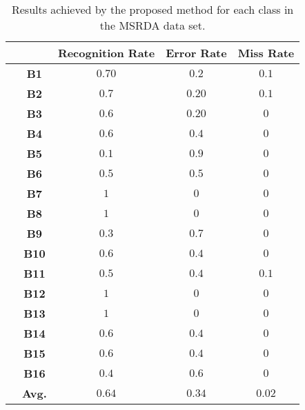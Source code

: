 \documentclass[runningheads,a4paper]{llncs}
\begin{document}
\begin{table}
\begin{scriptsize}
\setlength\tabcolsep{0.2cm}
	\renewcommand{\arraystretch}{1.3}
	\centering
	\begin{tabular}{|c|c|c|c|c|}
			\hline
		\multicolumn{2}{|c|}{~} & \bfseries Recognition Rate & \bfseries Error Rate & \bfseries Miss  Rate \\ \hline
    			
			\multirow{17}{*}{\rotatebox{90}{\bfseries Classes}} & \textbf{B1} & ${0.70}$ &$0.2$ & $0.1$	 \\
			~ & \textbf{B2} & ${0.7}$ 	&$0.20 $ & $0.1$  \\
			~ & \textbf{B3} & ${0.6}$ 	&$0.20 $ & $0$  \\
			~ & \textbf{B4} & ${0.6}$ 	&$0.4 $ & $0$  \\
			~ & \textbf{B5} & ${0.1}$ 	&$0.9 $ & $0$  \\
			~ & \textbf{B6} & ${0.5}$ 	&$0.5 $ & $0$  \\
			~ & \textbf{B7} & ${1}$ 	&$0 $ & $0$  \\
			~ & \textbf{B8} & ${1}$ 	&$0 $ & $0$  \\
			~ & \textbf{B9} & ${0.3}$ 	&$0.7 $ & $0$  \\
			~ & \textbf{B10} & ${0.6}$ 	&$0.4 $ & $0$  \\
			~ & \textbf{B11} & ${0.5}$ 	&$0.4 $ & $0.1$  \\
			~ & \textbf{B12} & ${1}$ 	&$0 $ & $0$ \\
			~ & \textbf{B13} & ${1}$ 	&$0 $ & $0$\\
			~ & \textbf{B14} & ${0.6}$ 	&$0.4 $ & $0$  \\
			~ & \textbf{B15} & ${0.6}$ 	&$0.4 $ & $0$  \\
			~ & \textbf{B16} & ${0.4}$ 	&$0.6 $ & $0$  \\  \hline 			
			~ & \textbf{Avg.} & ${0.64}$ &$0.34 $ & $0.02$  \\  \hline 			
		\end{tabular}
		\vspace{2mm}
	\caption{Results achieved by the proposed method for each class in the MSRDA data set.}
	\label{tab:miscl_msrda}
	\end{scriptsize}
\end{table} 
\end{document}
